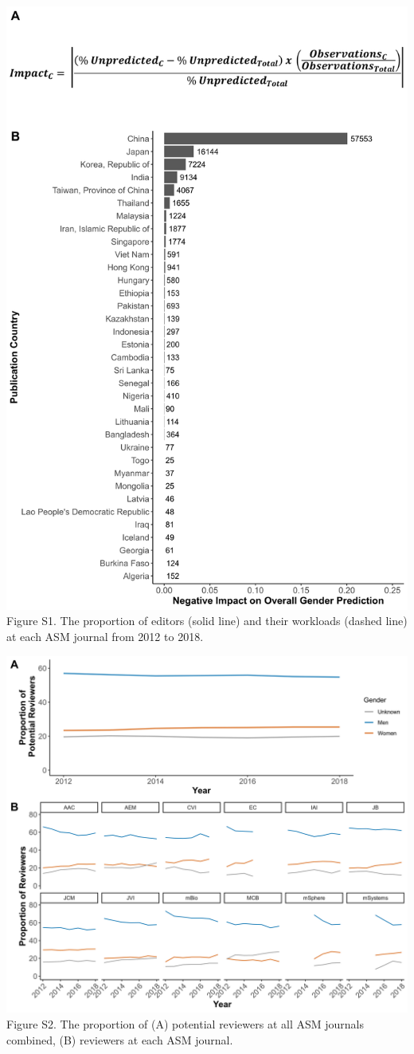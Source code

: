 \documentclass[11pt,]{article}
\begin{document}
\includegraphics{Figure_S1.png} Figure S1. The proportion of editors
(solid line) and their workloads (dashed line) at each ASM journal from
2012 to 2018.

\newpage

\includegraphics{Figure_S2.png} Figure S2. The proportion of (A)
potential reviewers at all ASM journals combined, (B) reviewers at each
ASM journal.
\end{document}
